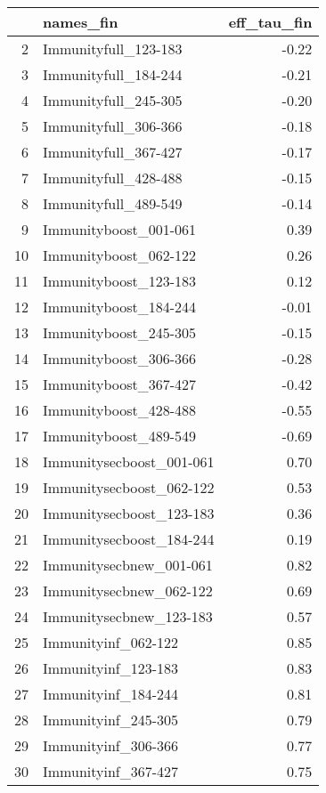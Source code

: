 \begin{table}[ht]
\centering
\begin{tabular}{rlr}
  \hline
 & names\_fin & eff\_tau\_fin \\ 
  \hline
2 & Immunityfull\_123-183 & -0.22 \\ 
  3 & Immunityfull\_184-244 & -0.21 \\ 
  4 & Immunityfull\_245-305 & -0.20 \\ 
  5 & Immunityfull\_306-366 & -0.18 \\ 
  6 & Immunityfull\_367-427 & -0.17 \\ 
  7 & Immunityfull\_428-488 & -0.15 \\ 
  8 & Immunityfull\_489-549 & -0.14 \\ 
  9 & Immunityboost\_001-061 & 0.39 \\ 
  10 & Immunityboost\_062-122 & 0.26 \\ 
  11 & Immunityboost\_123-183 & 0.12 \\ 
  12 & Immunityboost\_184-244 & -0.01 \\ 
  13 & Immunityboost\_245-305 & -0.15 \\ 
  14 & Immunityboost\_306-366 & -0.28 \\ 
  15 & Immunityboost\_367-427 & -0.42 \\ 
  16 & Immunityboost\_428-488 & -0.55 \\ 
  17 & Immunityboost\_489-549 & -0.69 \\ 
  18 & Immunitysecboost\_001-061 & 0.70 \\ 
  19 & Immunitysecboost\_062-122 & 0.53 \\ 
  20 & Immunitysecboost\_123-183 & 0.36 \\ 
  21 & Immunitysecboost\_184-244 & 0.19 \\ 
  22 & Immunitysecbnew\_001-061 & 0.82 \\ 
  23 & Immunitysecbnew\_062-122 & 0.69 \\ 
  24 & Immunitysecbnew\_123-183 & 0.57 \\ 
  25 & Immunityinf\_062-122 & 0.85 \\ 
  26 & Immunityinf\_123-183 & 0.83 \\ 
  27 & Immunityinf\_184-244 & 0.81 \\ 
  28 & Immunityinf\_245-305 & 0.79 \\ 
  29 & Immunityinf\_306-366 & 0.77 \\ 
  30 & Immunityinf\_367-427 & 0.75 \\ 

\end{tabular}
\end{table}
